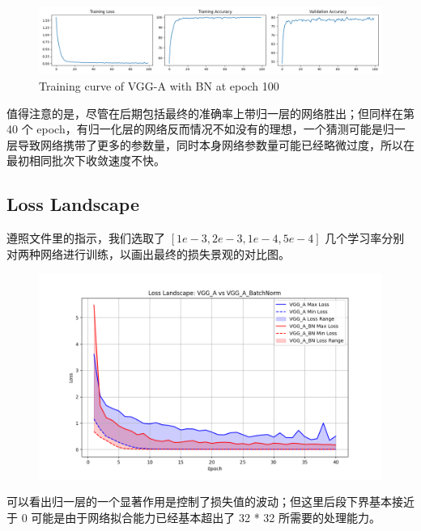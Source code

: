 \documentclass[10pt]{ctexart}
\begin{document}
\begin{figure}[h]
	\centering
	\includegraphics[width=0.9\linewidth]{training_curve_epoch_100.png}
	\caption{Training curve of VGG-A with BN at epoch 100}
\end{figure}

值得注意的是，尽管在后期包括最终的准确率上带归一层的网络胜出；但同样在第 40 个 epoch，有归一化层的网络反而情况不如没有的理想，一个猜测可能是归一层导致网络携带了更多的参数量，同时本身网络参数量可能已经略微过度，所以在最初相同批次下收敛速度不快。

\subsection{Loss Landscape}
遵照文件里的指示，我们选取了 $[1e-3, 2e-3, 1e-4, 5e-4]$ 几个学习率分别对两种网络进行训练，以画出最终的损失景观的对比图。

\begin{figure}[h]
	\centering
	\includegraphics[width=0.7\linewidth]{loss_landscape_bn.png}
	\caption{}
\end{figure}

可以看出归一层的一个显著作用是控制了损失值的波动；但这里后段下界基本接近于 0 可能是由于网络拟合能力已经基本超出了 32 * 32 所需要的处理能力。
\end{document}
